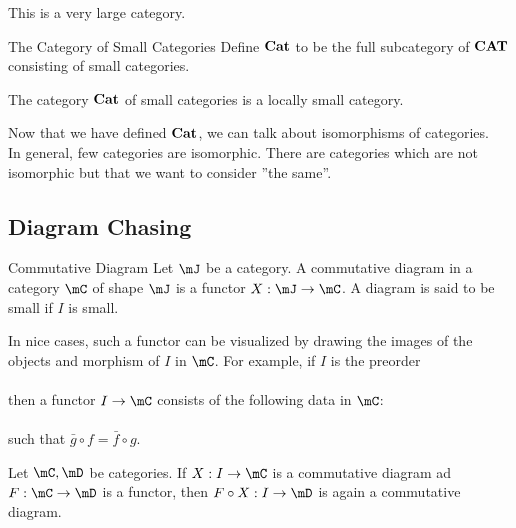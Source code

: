 \documentclass[a4paper]{article}
\begin{document}
This is a very large category. 

\begin{defn}{The Category of Small Categories}{} Define $\bold{Cat}$ to be the full subcategory of $\bold{CAT}$ consisting of small categories. 
\end{defn}

\begin{lmm}{}{} The category $\bold{Cat}$ of small categories is a locally small category. 
\end{lmm}

Now that we have defined $\bold{Cat}$, we can talk about isomorphisms of categories. \\

In general, few categories are isomorphic. There are categories which are not isomorphic but that we want to consider ''the same''. 

\subsection{Diagram Chasing}
\begin{defn}{Commutative Diagram}{} Let $\mJ$ be a category. A commutative diagram in a category $\mC$ of shape $\mJ$ is a functor $X:\mJ\to\mC$. A diagram is said to be small if $I$ is small. 
\end{defn}

In nice cases, such a functor can be visualized by drawing the images of the objects and morphism of $I$ in $\mC$. For example, if $I$ is the preorder \\
\\
then a functor $I\to\mC$ consists of the following data in $\mC$: \\
\\
such that $\bar{g}\circ f=\bar{f}\circ g$. \\

\begin{prp}{}{} Let $\mC,\mD$ be categories. If $X:I\to\mC$ is a commutative diagram ad $F:\mC\to\mD$ is a functor, then $F\circ X:I\to\mD$ is again a commutative diagram. 
\end{prp}
\end{document}
